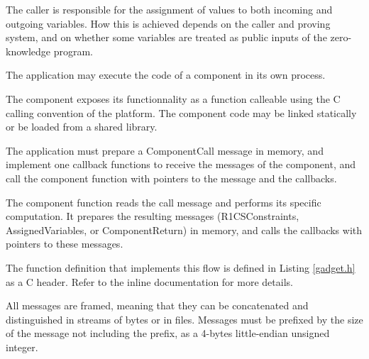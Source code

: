 	The caller is responsible for the assignment of values to both incoming and outgoing variables.
	How this is achieved depends on the caller and proving system,
	and on whether some variables are treated as public inputs of the zero-knowledge program.


	The application may execute the code of a component in its own process.

	The component exposes its functionnality as a function calleable using the C calling convention of the platform. The component code may be linked statically or be loaded from a shared library.

	The application must prepare a ComponentCall message in memory, and implement one callback functions to receive the messages of the component,
	and call the component function with pointers to the message and the callbacks.

	The component function reads the call message and performs its specific computation. It prepares the resulting messages (R1CSConstraints, AssignedVariables, or ComponentReturn) in memory, and calls the callbacks with pointers to these messages.

	The function definition that implements this flow is defined in Listing \ref{gadget.h} as a C header. Refer to the inline documentation for more details.

	All messages are framed, meaning that they can be concatenated and distinguished in streams of bytes or in files.
	Messages must be prefixed by the size of the message not including the prefix,
	as a 4-bytes little-endian unsigned integer.
